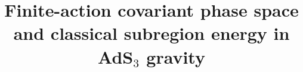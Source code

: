 \title{\textbf{Finite-action covariant phase space and classical subregion energy in AdS$_3$ gravity}}

\author{}

\date{}
\maketitle
